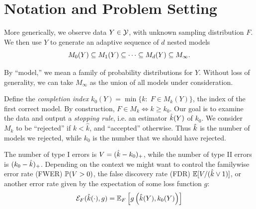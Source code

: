 \documentclass{article}
\begin{document}

\section{Notation and Problem Setting}
\label{sec:genericSetting}

More generically, we observe data $Y \in \cY$, with unknown sampling distribution $F$. We then use $Y$ to generate an adaptive sequence of $d$ nested models
\[
M_0(Y) \sub M_1(Y) \sub \cdots \sub M_d(Y) \sub M_\infty.
\]

By ``model,'' we mean a family of probability distributions for $Y$. Without loss of generality, we can take $M_\infty$ as the union of all models under consideration. 

Define the {\em completion index} $k_0(Y) = \min\{k:\; F \in M_k(Y)\}$, the index of the first correct model. By construction, $F\in M_k \iff k \geq k_0$. Our goal is to examine the data and output a {\em stopping rule}, i.e. an estimator $\hk(Y)$ of $k_0$. We consider $M_k$ to be ``rejected'' if $k < \hat k$, and ``accepted'' otherwise. Thus $\hk$ is the number of models we rejected, while $k_0$ is the number that we should have rejected. 

The number of type I errors is $V=(\hk-k_0)_+$, while the number of type II errors is $(k_0-\hk)_+$. Depending on the context we might want to control the familywise error rate (FWER) $\P(V>0)$, the false discovery rate (FDR) $\E[V/(\hk \vee 1)]$, or another error rate given by the expectation of some loss function $g$:
\begin{equation}\label{eq:errRate}
\Err_F(\hk(\cdot), g) = \E_F\left[ g\left(\hk(Y), k_0(Y)\right)\right]
\end{equation}
\end{document}
